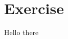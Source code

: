 \documentclass[a4paper]{article}
\begin{document}
\maketitle

\newpage
\tableofcontents
\newpage

\section{Exercise}

Hello there
\end{document}
